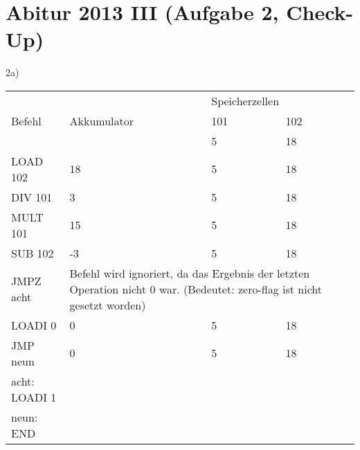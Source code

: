 \documentclass{lehramt-informatik-aufgabe}
\begin{document}

%

\section{Abitur 2013 III (Aufgabe 2, Check-Up)}

%

2a)

\begin{tabular}{llll}
              &                                              & \multicolumn{2}{l}{Speicherzellen}                                                                  \\
Befehl        & Akkumulator                                  & 101                                               & 102                                             \\
              &                                              & 5                                                 & 18                                              \\
LOAD 102      & 18                                           & 5                                                 & 18                                              \\
DIV 101       & 3                                            & 5                                                 & 18                                              \\
MULT 101      & 15                                           & 5                                                 & 18                                              \\
SUB 102       & -3                                           & 5                                                 & 18                                              \\
JMPZ acht     & \multicolumn{3}{l}{Befehl wird ignoriert, da 			das Ergebnis der letzten Operation nicht 0 war. (Bedeutet: 			zero-flag ist nicht gesetzt worden)} \\
LOADI 0       & 0                                            & 5                                                 & 18                                              \\
JMP neun      & 0                                            & 5                                                 & 18                                              \\
acht: LOADI 1 &                                              &                                                   &                                                 \\
neun: END     &                                              &                                                   &
\end{tabular}
\end{document}
